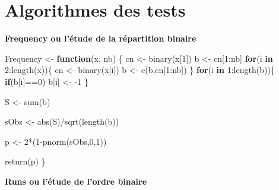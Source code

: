 \documentclass[
]{article}
\newenvironment{Shaded}{\begin{snugshade}}{\end{snugshade}}
\newcommand{\ControlFlowTok}[1]{\textcolor[rgb]{0.13,0.29,0.53}{\textbf{#1}}}
\newcommand{\DecValTok}[1]{\textcolor[rgb]{0.00,0.00,0.81}{#1}}
\newcommand{\FunctionTok}[1]{\textcolor[rgb]{0.00,0.00,0.00}{#1}}
\newcommand{\NormalTok}[1]{#1}
\newcommand{\OtherTok}[1]{\textcolor[rgb]{0.56,0.35,0.01}{#1}}
\newcommand{\SpecialCharTok}[1]{\textcolor[rgb]{0.00,0.00,0.00}{#1}}
\begin{document}
\section*{Algorithmes des tests}

\textbf{Frequency ou l'étude de la répartition binaire}
\label{frequency}

\begin{Shaded}
\begin{Highlighting}[]
\NormalTok{Frequency }\OtherTok{\textless{}{-}} \ControlFlowTok{function}\NormalTok{(x, nb)}
\NormalTok{\{}
\NormalTok{  cn }\OtherTok{\textless{}{-}} \FunctionTok{binary}\NormalTok{(x[}\DecValTok{1}\NormalTok{])}
\NormalTok{  b }\OtherTok{\textless{}{-}}\NormalTok{ cn[}\DecValTok{1}\SpecialCharTok{:}\NormalTok{nb]}
  \ControlFlowTok{for}\NormalTok{(i }\ControlFlowTok{in} \DecValTok{2}\SpecialCharTok{:}\FunctionTok{length}\NormalTok{(x))\{}
\NormalTok{    cn }\OtherTok{\textless{}{-}} \FunctionTok{binary}\NormalTok{(x[i])}
\NormalTok{    b }\OtherTok{\textless{}{-}} \FunctionTok{c}\NormalTok{(b,cn[}\DecValTok{1}\SpecialCharTok{:}\NormalTok{nb])}
\NormalTok{  \}}
  \ControlFlowTok{for}\NormalTok{(i }\ControlFlowTok{in} \DecValTok{1}\SpecialCharTok{:}\FunctionTok{length}\NormalTok{(b))\{}
    \ControlFlowTok{if}\NormalTok{(b[i]}\SpecialCharTok{==}\DecValTok{0}\NormalTok{)}
\NormalTok{      b[i] }\OtherTok{\textless{}{-}} \SpecialCharTok{{-}}\DecValTok{1}
\NormalTok{  \}}
  
\NormalTok{  S }\OtherTok{\textless{}{-}} \FunctionTok{sum}\NormalTok{(b)}
  
\NormalTok{  sObs }\OtherTok{\textless{}{-}} \FunctionTok{abs}\NormalTok{(S)}\SpecialCharTok{/}\FunctionTok{sqrt}\NormalTok{(}\FunctionTok{length}\NormalTok{(b))}
  
\NormalTok{  p }\OtherTok{\textless{}{-}} \DecValTok{2}\SpecialCharTok{*}\NormalTok{(}\DecValTok{1}\SpecialCharTok{{-}}\FunctionTok{pnorm}\NormalTok{(sObs,}\DecValTok{0}\NormalTok{,}\DecValTok{1}\NormalTok{))}
  
  \FunctionTok{return}\NormalTok{(p)}
\NormalTok{\}}
\end{Highlighting}
\end{Shaded}

\textbf{Runs ou l'étude de l'ordre binaire} \label{runs}
\end{document}
